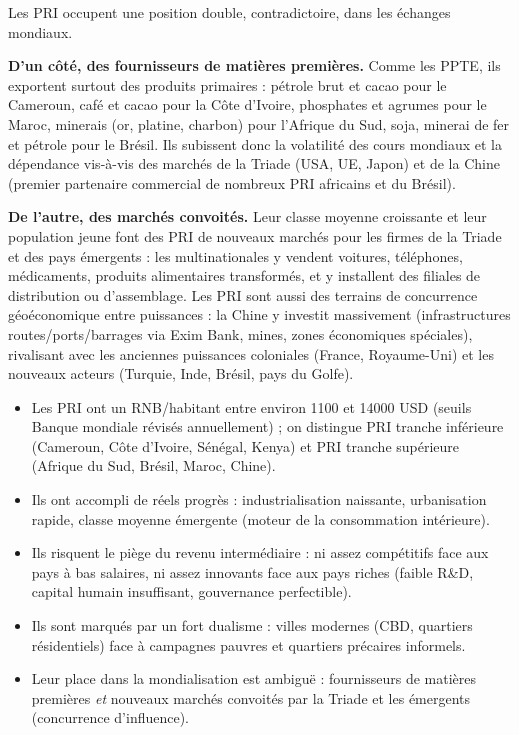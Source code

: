 \documentclass[11pt]{article}
\newcommand{\cle}[1]{{\popxbold\color{popdark}#1}}
\newcounter{popsec}
\newcounter{popsub}
\newcommand{\courssub}[1]{%
  \stepcounter{popsub}%
  \par\vspace{9pt}\noindent{\popxbold\fontsize{11.5}{13}\selectfont\color{popink}{\color{poporange}\thepopsec.\thepopsub}\hspace{6pt}#1}\par\nopagebreak\vspace{4pt}
}
\begin{document}
\courssub{Une place ambiguë dans la mondialisation}

Les PRI occupent une position double, contradictoire, dans les échanges mondiaux.

\textbf{D'un côté, des fournisseurs de matières premières.} Comme les PPTE, ils exportent surtout des produits primaires : pétrole brut et cacao pour le Cameroun, café et cacao pour la Côte d'Ivoire, phosphates et agrumes pour le Maroc, minerais (or, platine, charbon) pour l'Afrique du Sud, soja, minerai de fer et pétrole pour le Brésil. Ils subissent donc la volatilité des cours mondiaux et la dépendance vis-à-vis des marchés de la Triade (USA, UE, Japon) et de la Chine (premier partenaire commercial de nombreux PRI africains et du Brésil).

\textbf{De l'autre, des marchés convoités.} Leur classe moyenne croissante et leur population jeune font des PRI de \cle{nouveaux marchés} pour les firmes de la Triade et des pays émergents : les multinationales y vendent voitures, téléphones, médicaments, produits alimentaires transformés, et y installent des filiales de distribution ou d'assemblage. Les PRI sont aussi des terrains de concurrence géoéconomique entre puissances : la Chine y investit massivement (infrastructures routes/ports/barrages via Exim Bank, mines, zones économiques spéciales), rivalisant avec les anciennes puissances coloniales (France, Royaume-Uni) et les nouveaux acteurs (Turquie, Inde, Brésil, pays du Golfe).

\begin{aretenir}
\begin{itemize}
\item Les \cle{PRI} ont un RNB/habitant entre environ \num{1100} et \num{14000} USD (seuils Banque mondiale révisés annuellement) ; on distingue PRI tranche inférieure (Cameroun, Côte d'Ivoire, Sénégal, Kenya) et PRI tranche supérieure (Afrique du Sud, Brésil, Maroc, Chine).
\item Ils ont accompli de réels progrès : industrialisation naissante, urbanisation rapide, classe moyenne émergente (moteur de la consommation intérieure).
\item Ils risquent le \cle{piège du revenu intermédiaire} : ni assez compétitifs face aux pays à bas salaires, ni assez innovants face aux pays riches (faible R\&D, capital humain insuffisant, gouvernance perfectible).
\item Ils sont marqués par un fort \cle{dualisme} : villes modernes (CBD, quartiers résidentiels) face à campagnes pauvres et quartiers précaires informels.
\item Leur place dans la mondialisation est ambiguë : fournisseurs de matières premières \emph{et} nouveaux marchés convoités par la Triade et les émergents (concurrence d'influence).
\end{itemize}
\end{aretenir}
\end{document}

